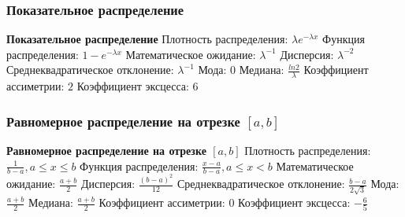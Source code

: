 \subsubsection{Показательное распределение}
\textbf{Показательное распределение} 
Плотность распределения: $\lambda e^{-\lambda x}$
Функция распределения: $1 - e^{-\lambda x} $
Математическое ожидание:  $\lambda^{-1}$
Дисперсия:  $\lambda^{-2}$
Среднеквадратическое отклонение: $\lambda^{-1}$
Мода: $0$
Медиана: $\frac{ln2}{\lambda}$
Коэффициент ассиметрии: $2$
Коэффициент эксцесса: $6$ 

\subsubsection{Равномерное распределение на отрезке $[a,b]$}
\textbf{Равномерное распределение на отрезке $[a,b]$} 
Плотность распределения: $\frac{1}{b-a}, a\le x \le b$
Функция распределения: $\frac{x-a}{b-a}, a \le x < b$
Математическое ожидание: $\frac{a+b}{2}$
Дисперсия: $\frac{(b-a)^2}{12}$
Среднеквадратическое отклонение: $\frac{b-a}{2\sqrt{3}}$
Мода: $\frac{a+b}{2}$
Медиана: $\frac{a+b}{2}$
Коэффициент ассиметрии: $0$
Коэффициент эксцесса: $-\frac{6}{5}$
